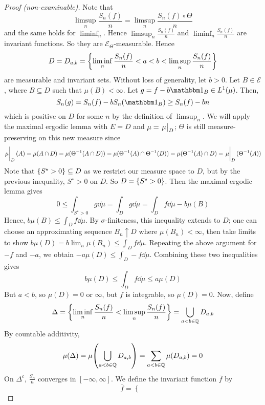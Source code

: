 \begin{proof}[Proof (non-examinable)]
    Note that
    \[ \limsup_n \frac{S_n(f)}{n} =  \limsup_n \frac{S_n(f) \circ \Theta}{n} \]
    and the same holds for \( \liminf_n \).
    Hence \( \limsup_n \frac{S_n(f)}{n} \) and \( \liminf_n \frac{S_n(f)}{n} \) are invariant functions.
    So they are \( \mathcal E_\Theta \)-measurable.
    Hence
    \[ D = D_{a,b} = \qty{\liminf_n \frac{S_n(f)}{n} < a < b < \limsup_n \frac{S_n(f)}{n}} \]
    are measurable and invariant sets.
    Without loss of generality, let \( b > 0 \).
    Let \( B \in \mathcal E \), where \( B \subseteq D \) such that \( \mu(B) < \infty \).
    Let \( g = f - b\mathbbm 1_B \in L^1(\mu) \).
    Then,
    \[ S_n(g) = S_n(f) - bS_n(\mathbbm 1_B) \geq S_n(f) - bn \]
    which is positive on \( D \) for some \( n \) by the definition of \( \limsup_n \).
    We will apply the maximal ergodic lemma with \( E = D \) and \( \mu = \eval{\mu}_D \); \( \Theta \) is still measure-preserving on this new measure since
    \[ \eval{\mu}_D(A) = \mu(A \cap D) = \mu(\Theta^{-1}(A \cap D)) = \mu(\Theta^{-1}(A) \cap \Theta^{-1}(D)) = \mu(\Theta^{-1}(A) \cap D) = \eval{\mu}_D(\Theta^{-1}(A)) \]
    Note that \( \qty{S^\star > 0} \subseteq D \) as we restrict our measure space to \( D \), but by the previous inequality, \( S^\star > 0 \) on \( D \).
    So \( D = \qty{S^\star > 0} \).
    Then the maximal ergodic lemma gives
    \[ 0 \leq \int_{S^\star > 0} g \dd{\mu} = \int_D g \dd{\mu} = \int_D f \dd{\mu} - b \mu(B) \]
    Hence, \( b \mu(B) \leq \int_D f \dd{\mu} \).
    By \( \sigma \)-finiteness, this inequality extends to \( D \); one can choose an approximating sequence \( B_n \uparrow D \) where \( \mu(B_n) < \infty \), then take limits to show \( b\mu(D) = b \lim_n \mu(B_n) \leq \int_D f \dd{\mu} \).
    Repeating the above argument for \( -f \) and \( -a \), we obtain \( -a\mu(D) \leq \int_D -f \dd{\mu} \).
    Combining these two inequalities gives
    \[ b\mu(D) \leq \int_D f \dd{\mu} \leq a\mu(D) \]
    But \( a < b \), so \( \mu(D) = 0 \) or \( \infty \), but \( f \) is integrable, so \( \mu(D) = 0 \).
    Now, define
    \[ \Delta = \qty{\liminf_n \frac{S_n(f)}{n} < \limsup_n \frac{S_n(f)}{n}}  = \bigcup_{a < b \in \mathbb Q} D_{a,b} \]
    By countable additivity,
    \[ \mu(\Delta) = \mu\qty(\bigcup_{a < b \in \mathbb Q} D_{a,b}) = \sum_{a < b \in \mathbb Q} \mu(D_{a,b}) = 0 \]
    On \( \Delta^c \), \( \frac{S_n}{n} \) converges in \( [-\infty, \infty] \).
    We define the invariant function \( \overline f \) by
    \[ \overline f = \begin{cases}

\end{cases}\]
\end{proof}
